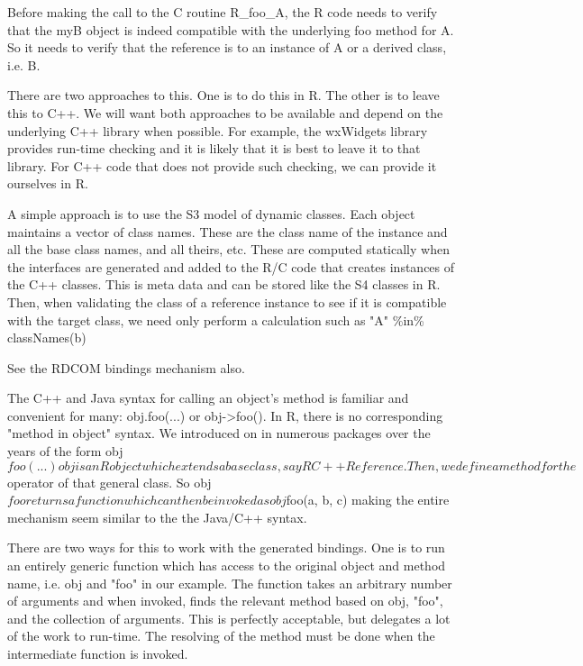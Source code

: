 \documentclass{article}
\begin{document}
Before making the call to the C routine R_foo_A,
the R code needs to verify that the myB object is
indeed compatible with the underlying foo method
for A. So it needs to verify that the reference is
to an instance of A or a derived class, i.e. B.

There are two approaches to this.
One is to do this in R.
The other is to leave this to C++.
We will want both approaches to be available
and depend on the underlying C++ library when 
possible. For example, the wxWidgets library
provides run-time checking and it is likely
that it is best to leave it to that library.
For C++ code that does not provide such checking,
we can provide it ourselves in R.

A simple approach is to use the S3 model
of dynamic classes.
Each object maintains a vector of class
names. These are the class name of the instance
and all the base class names, and all theirs, etc.
These are computed statically when the interfaces are 
generated and added to the R/C code that
creates instances of the C++ classes.
This is meta data and can be stored like the S4
classes in R.
Then, when validating the class of a reference instance 
to see if it is compatible with the target class,
we need only perform a calculation such as
 "A" \%in\% classNames(b)



See the RDCOM bindings mechanism also.



The C++ and Java syntax for calling an object's method
is familiar and convenient for many:  obj.foo(...)
or obj->foo().
In R, there is no corresponding
"method in object" syntax.
We introduced on in numerous packages over
the years of the form
  obj$foo(...)

obj is an R object which extends a base class, say RC++Reference.
Then, we define a method for the $ operator of that general class.  So
obj$foo returns a function which can then be invoked as obj$foo(a, b,
c) making the entire mechanism seem similar to the the Java/C++
syntax.

There are two ways for this to work with the generated bindings.
One is to run an entirely generic function
which has access to the original object and method name,
i.e. obj and "foo" in our  example.
The function takes an arbitrary number of arguments
and when invoked, finds the relevant method
based on obj, "foo", and the collection of arguments.
This is perfectly acceptable, but delegates a lot of the work
to run-time. The resolving of the method must be
done when the intermediate function is invoked.
\end{document}
